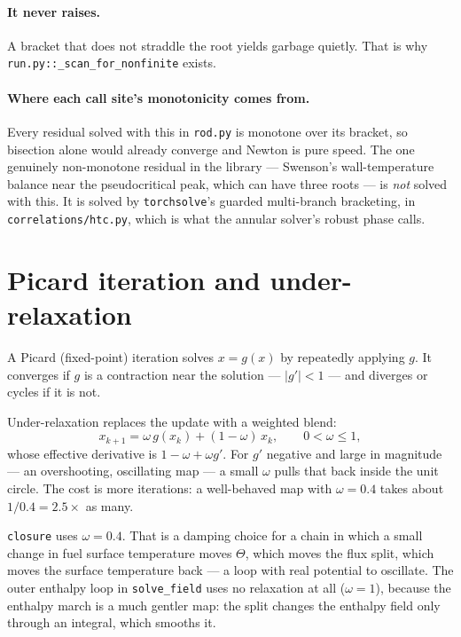 \documentclass[11pt]{article}
\newcommand{\code}[1]{\texttt{#1}}
\begin{document}
\paragraph{It never raises.} A bracket that does not straddle the root yields garbage
quietly. That is why \code{run.py::\_scan\_for\_nonfinite} exists.

\paragraph{Where each call site's monotonicity comes from.} Every residual solved with
this in \code{rod.py} is monotone over its bracket, so bisection alone would already
converge and Newton is pure speed. The one genuinely non-monotone residual in the library
--- Swenson's wall-temperature balance near the pseudocritical peak, which can have three
roots --- is \emph{not} solved with this. It is solved by \code{torchsolve}'s guarded
multi-branch bracketing, in \code{correlations/htc.py}, which is what the annular
solver's robust phase calls.

\section{Picard iteration and under-relaxation}
\label{sec:picard}

A Picard (fixed-point) iteration solves $x = g(x)$ by repeatedly applying $g$. It
converges if $g$ is a contraction near the solution --- $|g'| < 1$ --- and diverges or
cycles if it is not.

Under-relaxation replaces the update with a weighted blend:
\begin{equation}
x_{k+1} = \omega\, g(x_k) + (1-\omega)\, x_k, \qquad 0 < \omega \le 1,
\end{equation}
whose effective derivative is $1 - \omega + \omega g'$. For $g' $ negative and large in
magnitude --- an overshooting, oscillating map --- a small $\omega$ pulls that back inside
the unit circle. The cost is more iterations: a well-behaved map with $\omega = 0.4$ takes
about $1/0.4 = 2.5\times$ as many.

\code{closure} uses $\omega = 0.4$. That is a damping choice for a chain in which a small
change in fuel surface temperature moves $\Theta$, which moves the flux split, which moves
the surface temperature back --- a loop with real potential to oscillate. The outer
enthalpy loop in \code{solve\_field} uses no relaxation at all ($\omega = 1$), because
the enthalpy march is a much gentler map: the split changes the enthalpy field only
through an integral, which smooths it.
\end{document}
